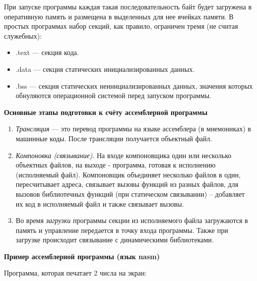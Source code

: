 При запуске программы каждая такая последовательность байт будет загружена в оперативную память и размещена в выделенных для нее ячейках памяти.
В простых программах набор секций, как правило, ограничен тремя (не считая служебных):
 \begin{itemize}
     \item .text --- секция кода.
     \item .data --- секция статических инициализированных данных.
     \item .bss --- секция статических неинициализированных данных, значения которых обнуляются операционной системой перед запуском программы.
 \end{itemize}

\textbf{Основные этапы подготовки к счёту ассемблерной программы}

\begin{enumerate}
    \item \textit{Трансляция} --- это перевод программы на языке ассемблера (в мнемониках) в машинные коды. После трансляции получается объектный файл.
    \item \textit{Компоновка (связывание)}. На входе компоновщика один или несколько объектных файлов, на выходе - программа, готовая к исполнению (исполняемый файл). Компоновщик объединяет несколько файлов в один, пересчитывает адреса, связывает вызовы функций из разных файлов, для вызовов библиотечных функций (при статическом связывании) -- добавляет их код в исполняемый файл и также связывает вызовы.
    \item Во время \textit{загрузки} программы секции из исполняемого файла загружаются в память и управление передается в точку входа программы. Также при загрузке происходит связывание с динамическими библиотеками.
\end{enumerate}

\textbf{Пример ассемблерной программы (язык nasm)}

Программа, которая печатает 2 числа на экран:

